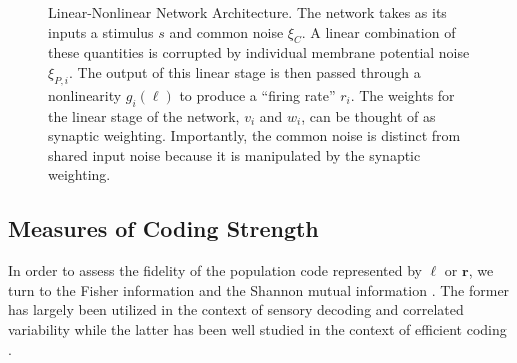 \documentclass[12pt]{article}
\begin{document}
\begin{figure}[ht]
{}
	
	\caption{Linear-Nonlinear Network Architecture. The network takes as its inputs a stimulus $s$ and common noise $\xi_C$. A linear combination of these quantities is corrupted by individual membrane potential noise $\xi_{P,i}$. The output of this linear stage is then passed through a nonlinearity $g_i(\ell)$ to produce a ``firing rate'' $r_i$. The weights for the linear stage of the network, $v_i$ and $w_i$, can be thought of as synaptic weighting. Importantly, the common noise is distinct from  shared input noise because it is manipulated by the synaptic weighting.}
	\label{architecture}
\end{figure}

\subsection{Measures of Coding Strength}
In order to assess the fidelity of the population code represented by $\boldsymbol{\ell}$ or $\mathbf{r}$, we turn to the Fisher information and the Shannon mutual information \citep{cover2006}. The former has largely been utilized in the context of sensory decoding and correlated variability \citep{abbott1999} while the latter has been well studied in the context of efficient coding \citep{attneave1954, barlow1961, bell1997}. 
\end{document}

